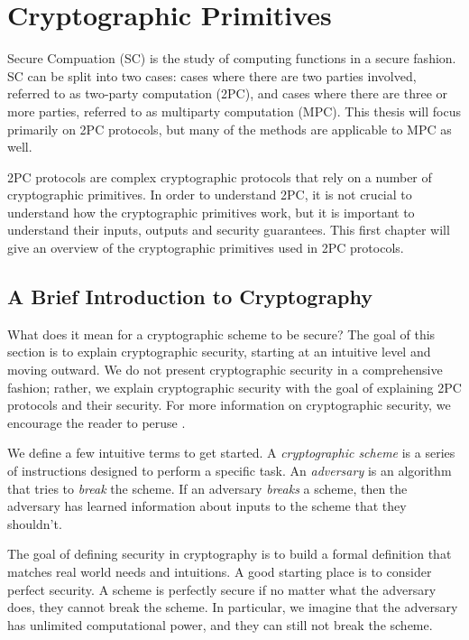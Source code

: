 \chapter{Cryptographic Primitives}
Secure Compuation (SC) is the study of computing functions in a secure fashion. 
SC can be split into two cases: cases where there are two parties involved, referred to as two-party computation (2PC), and cases where there are three or more parties, referred to as multiparty computation (MPC).
This thesis will focus primarily on 2PC protocols, but many of the methods are applicable to MPC as well.

2PC protocols are complex cryptographic protocols that rely on a number of cryptographic primitives.
In order to understand 2PC, it is not crucial to understand how the cryptographic primitives work, but it is important to understand their inputs, outputs and security guarantees. 
This first chapter will give an overview of the cryptographic primitives used in 2PC protocols.

\section{A Brief Introduction to Cryptography} 
What does it mean for a cryptographic scheme to be secure? 
The goal of this section is to explain cryptographic security, starting at an intuitive level and moving outward. 
We do not present cryptographic security in a comprehensive fashion; rather, we explain cryptographic security with the goal of explaining 2PC protocols and their security.
For more information on cryptographic security, we encourage the reader to peruse \cite{katzlindelltextbook}. 

We define a few intuitive terms to get started.
A \textit{cryptographic scheme} is a series of instructions designed to perform a specific task. 
An \textit{adversary} is an algorithm that tries to \textit{break} the scheme. 
If an adversary \textit{breaks} a scheme, then the adversary has learned information about inputs to the scheme that they shouldn't. 

The goal of defining security in cryptography is to build a formal definition that matches real world needs and intuitions. 
A good starting place is to consider perfect security. 
A scheme is perfectly secure if no matter what the adversary does, they cannot break the scheme.
In particular, we imagine that the adversary has unlimited computational power, and they can still not break the scheme.

